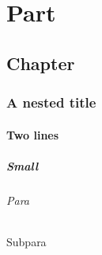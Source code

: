 \part{Part}
\chapter[Short]{Chapter}
\section*{A {nested} title}
\subsection{Two
lines}
\subsubsection{Small}
\paragraph{Para}
\subparagraph{Subpara}
